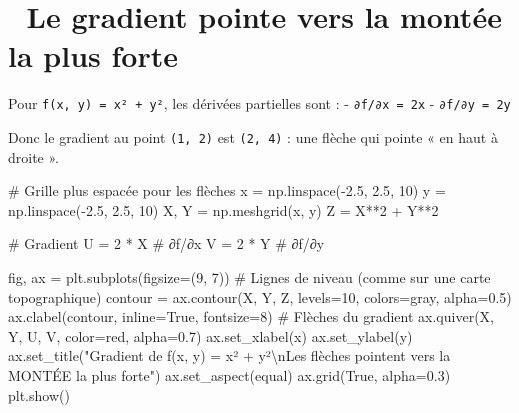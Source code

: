 \documentclass[
  french,
  11pt,
  a4paper,
]{scrbook}
\newenvironment{Shaded}{}{}
\newcommand{\CharTok}[1]{\textcolor[rgb]{0.01,0.18,0.38}{#1}}
\newcommand{\CommentTok}[1]{\textcolor[rgb]{0.42,0.45,0.49}{#1}}
\newcommand{\DecValTok}[1]{\textcolor[rgb]{0.00,0.36,0.77}{#1}}
\newcommand{\FloatTok}[1]{\textcolor[rgb]{0.00,0.36,0.77}{#1}}
\newcommand{\NormalTok}[1]{\textcolor[rgb]{0.14,0.16,0.18}{#1}}
\newcommand{\OperatorTok}[1]{\textcolor[rgb]{0.14,0.16,0.18}{#1}}
\newcommand{\StringTok}[1]{\textcolor[rgb]{0.01,0.18,0.38}{#1}}
\newcommand{\VariableTok}[1]{\textcolor[rgb]{0.89,0.38,0.04}{#1}}
\begin{document}
\section{🧭 Le gradient pointe vers la montée la plus
forte}\label{le-gradient-pointe-vers-la-montuxe9e-la-plus-forte}

Pour \texttt{f(x,\ y)\ =\ x²\ +\ y²}, les dérivées partielles sont : -
\texttt{∂f/∂x\ =\ 2x} - \texttt{∂f/∂y\ =\ 2y}

Donc le gradient au point \texttt{(1,\ 2)} est \texttt{(2,\ 4)} : une
flèche qui pointe « en haut à droite ».

\begin{Shaded}
\begin{Highlighting}[]
\CommentTok{\# Grille plus espacée pour les flèches}
\NormalTok{x }\OperatorTok{=}\NormalTok{ np.linspace(}\OperatorTok{{-}}\FloatTok{2.5}\NormalTok{, }\FloatTok{2.5}\NormalTok{, }\DecValTok{10}\NormalTok{)}
\NormalTok{y }\OperatorTok{=}\NormalTok{ np.linspace(}\OperatorTok{{-}}\FloatTok{2.5}\NormalTok{, }\FloatTok{2.5}\NormalTok{, }\DecValTok{10}\NormalTok{)}
\NormalTok{X, Y }\OperatorTok{=}\NormalTok{ np.meshgrid(x, y)}
\NormalTok{Z }\OperatorTok{=}\NormalTok{ X}\OperatorTok{**}\DecValTok{2} \OperatorTok{+}\NormalTok{ Y}\OperatorTok{**}\DecValTok{2}

\CommentTok{\# Gradient}
\NormalTok{U }\OperatorTok{=} \DecValTok{2} \OperatorTok{*}\NormalTok{ X  }\CommentTok{\# ∂f/∂x}
\NormalTok{V }\OperatorTok{=} \DecValTok{2} \OperatorTok{*}\NormalTok{ Y  }\CommentTok{\# ∂f/∂y}

\NormalTok{fig, ax }\OperatorTok{=}\NormalTok{ plt.subplots(figsize}\OperatorTok{=}\NormalTok{(}\DecValTok{9}\NormalTok{, }\DecValTok{7}\NormalTok{))}
\CommentTok{\# Lignes de niveau (comme sur une carte topographique)}
\NormalTok{contour }\OperatorTok{=}\NormalTok{ ax.contour(X, Y, Z, levels}\OperatorTok{=}\DecValTok{10}\NormalTok{, colors}\OperatorTok{=}\StringTok{\textquotesingle{}gray\textquotesingle{}}\NormalTok{, alpha}\OperatorTok{=}\FloatTok{0.5}\NormalTok{)}
\NormalTok{ax.clabel(contour, inline}\OperatorTok{=}\VariableTok{True}\NormalTok{, fontsize}\OperatorTok{=}\DecValTok{8}\NormalTok{)}
\CommentTok{\# Flèches du gradient}
\NormalTok{ax.quiver(X, Y, U, V, color}\OperatorTok{=}\StringTok{\textquotesingle{}red\textquotesingle{}}\NormalTok{, alpha}\OperatorTok{=}\FloatTok{0.7}\NormalTok{)}
\NormalTok{ax.set\_xlabel(}\StringTok{\textquotesingle{}x\textquotesingle{}}\NormalTok{)}
\NormalTok{ax.set\_ylabel(}\StringTok{\textquotesingle{}y\textquotesingle{}}\NormalTok{)}
\NormalTok{ax.set\_title(}\StringTok{"Gradient de f(x, y) = x² + y²}\CharTok{\textbackslash{}n}\StringTok{Les flèches pointent vers la MONTÉE la plus forte"}\NormalTok{)}
\NormalTok{ax.set\_aspect(}\StringTok{\textquotesingle{}equal\textquotesingle{}}\NormalTok{)}
\NormalTok{ax.grid(}\VariableTok{True}\NormalTok{, alpha}\OperatorTok{=}\FloatTok{0.3}\NormalTok{)}
\NormalTok{plt.show()}
\end{Highlighting}
\end{Shaded}
\end{document}
